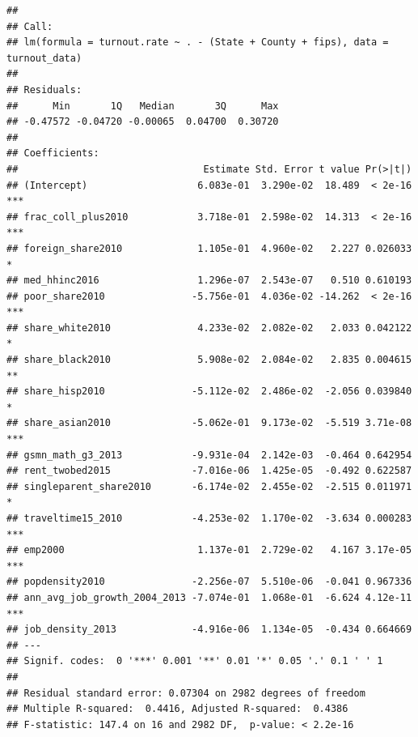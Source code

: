\documentclass[
]{article}
\begin{document}
\begin{verbatim}
## 
## Call:
## lm(formula = turnout.rate ~ . - (State + County + fips), data = turnout_data)
## 
## Residuals:
##      Min       1Q   Median       3Q      Max 
## -0.47572 -0.04720 -0.00065  0.04700  0.30720 
## 
## Coefficients:
##                                Estimate Std. Error t value Pr(>|t|)    
## (Intercept)                   6.083e-01  3.290e-02  18.489  < 2e-16 ***
## frac_coll_plus2010            3.718e-01  2.598e-02  14.313  < 2e-16 ***
## foreign_share2010             1.105e-01  4.960e-02   2.227 0.026033 *  
## med_hhinc2016                 1.296e-07  2.543e-07   0.510 0.610193    
## poor_share2010               -5.756e-01  4.036e-02 -14.262  < 2e-16 ***
## share_white2010               4.233e-02  2.082e-02   2.033 0.042122 *  
## share_black2010               5.908e-02  2.084e-02   2.835 0.004615 ** 
## share_hisp2010               -5.112e-02  2.486e-02  -2.056 0.039840 *  
## share_asian2010              -5.062e-01  9.173e-02  -5.519 3.71e-08 ***
## gsmn_math_g3_2013            -9.931e-04  2.142e-03  -0.464 0.642954    
## rent_twobed2015              -7.016e-06  1.425e-05  -0.492 0.622587    
## singleparent_share2010       -6.174e-02  2.455e-02  -2.515 0.011971 *  
## traveltime15_2010            -4.253e-02  1.170e-02  -3.634 0.000283 ***
## emp2000                       1.137e-01  2.729e-02   4.167 3.17e-05 ***
## popdensity2010               -2.256e-07  5.510e-06  -0.041 0.967336    
## ann_avg_job_growth_2004_2013 -7.074e-01  1.068e-01  -6.624 4.12e-11 ***
## job_density_2013             -4.916e-06  1.134e-05  -0.434 0.664669    
## ---
## Signif. codes:  0 '***' 0.001 '**' 0.01 '*' 0.05 '.' 0.1 ' ' 1
## 
## Residual standard error: 0.07304 on 2982 degrees of freedom
## Multiple R-squared:  0.4416, Adjusted R-squared:  0.4386 
## F-statistic: 147.4 on 16 and 2982 DF,  p-value: < 2.2e-16
\end{verbatim}
\end{document}
